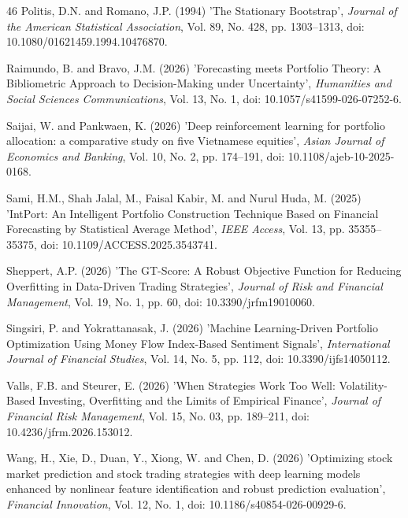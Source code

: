 \documentclass{singlecol-new}
\theoremstyle{TH}{
\newtheorem{lemma}{Lemma}
\newtheorem{theorem}[lemma]{Theorem}
\newtheorem{corrolary}[lemma]{Corrolary}
\newtheorem{conjecture}[lemma]{Conjecture}
\newtheorem{proposition}[lemma]{Proposition}
\newtheorem{claim}[lemma]{Claim}
\newtheorem{stheorem}[lemma]{Wrong Theorem}
\newtheorem{algorithm}{Algorithm}
}
\theoremstyle{THrm}{
\newtheorem{definition}{Definition}[section]
\newtheorem{question}{Question}[section]
\newtheorem{remark}{Remark}
\newtheorem{scheme}{Scheme}
}
\theoremstyle{THhit}{
\newtheorem{case}{Case}[section]
}
\begin{document}
\begin{thebibliography}{46}
Politis, D.N. and Romano, J.P. (1994) 'The Stationary Bootstrap', {\it Journal of the American Statistical Association}, Vol. 89, No. 428, pp. 1303--1313, doi: 10.1080/01621459.1994.10476870.

Raimundo, B. and Bravo, J.M. (2026) 'Forecasting meets Portfolio Theory: A Bibliometric Approach to Decision-Making under Uncertainty', {\it Humanities and Social Sciences Communications}, Vol. 13, No. 1, doi: 10.1057/s41599-026-07252-6.

Saijai, W. and Pankwaen, K. (2026) 'Deep reinforcement learning for portfolio allocation: a comparative study on five Vietnamese equities', {\it Asian Journal of Economics and Banking}, Vol. 10, No. 2, pp. 174--191, doi: 10.1108/ajeb-10-2025-0168.

Sami, H.M., Shah Jalal, M., Faisal Kabir, M. and Nurul Huda, M. (2025) 'IntPort: An Intelligent Portfolio Construction Technique Based on Financial Forecasting by Statistical Average Method', {\it IEEE Access}, Vol. 13, pp. 35355--35375, doi: 10.1109/ACCESS.2025.3543741.

Sheppert, A.P. (2026) 'The GT-Score: A Robust Objective Function for Reducing Overfitting in Data-Driven Trading Strategies', {\it Journal of Risk and Financial Management}, Vol. 19, No. 1, pp. 60, doi: 10.3390/jrfm19010060.

Singsiri, P. and Yokrattanasak, J. (2026) 'Machine Learning-Driven Portfolio Optimization Using Money Flow Index-Based Sentiment Signals', {\it International Journal of Financial Studies}, Vol. 14, No. 5, pp. 112, doi: 10.3390/ijfs14050112.

Valls, F.B. and Steurer, E. (2026) 'When Strategies Work Too Well: Volatility-Based Investing, Overfitting and the Limits of Empirical Finance', {\it Journal of Financial Risk Management}, Vol. 15, No. 03, pp. 189--211, doi: 10.4236/jfrm.2026.153012.

Wang, H., Xie, D., Duan, Y., Xiong, W. and Chen, D. (2026) 'Optimizing stock market prediction and stock trading strategies with deep learning models enhanced by nonlinear feature identification and robust prediction evaluation', {\it Financial Innovation}, Vol. 12, No. 1, doi: 10.1186/s40854-026-00929-6.


\end{thebibliography}
\end{document}

